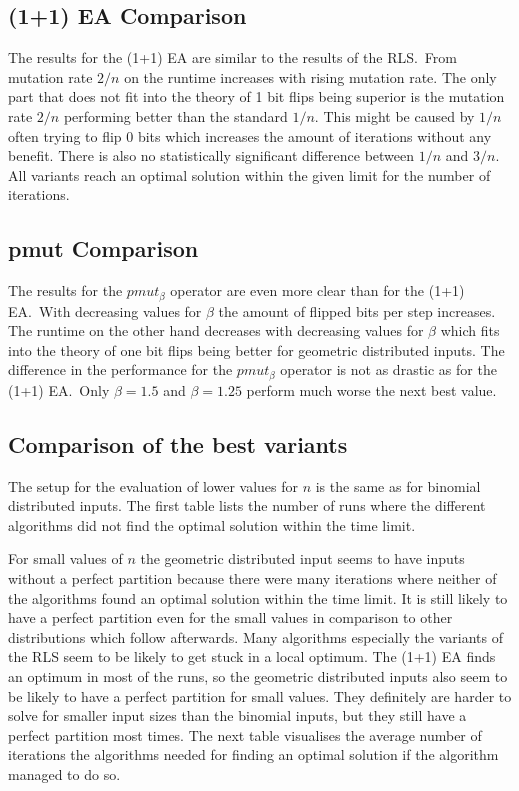 \subsection{(1+1) EA Comparison}

The results for the (1+1) EA are similar to the results of the RLS.\ 
From mutation rate $2/n$ on the runtime increases with rising mutation rate.
The only part that does not fit into the theory of 1 bit flips being superior is the mutation rate $2/n$ performing better than the standard $1/n$.
This might be caused by $1/n$ often trying to flip 0 bits which increases the amount of iterations without any benefit.
There is also no statistically significant difference between $1/n$ and $3/n$.
All variants reach an optimal solution within the given limit for the number of iterations.
\subsection{pmut Comparison}

The results for the $pmut_\beta$ operator are even more clear than for the (1+1) EA.\
With decreasing values for $\beta$ the amount of flipped bits per step increases.
The runtime on the other hand decreases with decreasing values for $\beta$ which fits into the theory of one bit flips being better for geometric distributed inputs.
The difference in the performance for the $pmut_\beta$ operator is not as drastic as for the (1+1) EA.\ 
Only $\beta=1.5$ and $\beta=1.25$ perform much worse the next best value.

\subsection{Comparison of the best variants}
The setup for the evaluation of lower values for $n$ is the same as for binomial distributed inputs.
The first table lists the number of runs where the different algorithms did not find the optimal solution within the time limit.



For small values of $n$ the geometric distributed input seems to have inputs without a perfect partition because there were many iterations where neither of the algorithms found an optimal solution within the time limit.
It is still likely to have a perfect partition even for the small values in comparison to other distributions which follow afterwards.
Many algorithms especially the variants of the RLS seem to be likely to get stuck in a local optimum.
The (1+1) EA finds an optimum in most of the runs, so the geometric distributed inputs also seem to be likely to have a perfect partition for small values.
They definitely are harder to solve for smaller input sizes than the binomial inputs, but they still have a perfect partition most times.
The next table visualises the average number of iterations the algorithms needed for finding an optimal solution if the algorithm managed to do so.

